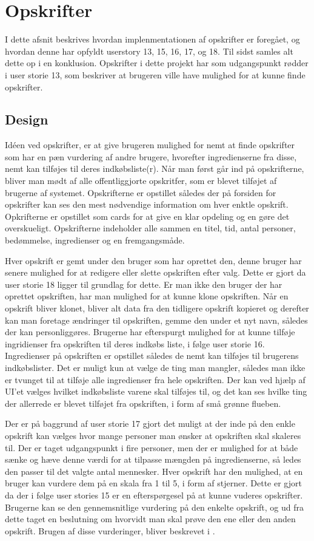 \section{Opskrifter}
I dette afsnit beskrives hvordan implenmentationen af opskrifter er foregået, og hvordan denne har opfyldt userstory 13, 15, 16, 17, og 18. Til sidst samles alt dette op i en konklusion. Opskrifter i dette projekt har som udgangspunkt rødder i user storie 13, som beskriver at brugeren ville have mulighed for at kunne finde opskrifter.
\subsection{Design}
Idéen ved opskrifter, er at give brugeren mulighed for nemt at finde opskrifter som har en pæn vurdering af andre brugere, hvorefter ingredienserne fra disse, nemt kan tilføjes til deres indkøbsliste(r).
Når man først går ind på opskrifterne, bliver man mødt af alle offentliggjorte opskritfer, som er blevet tilføjet af brugerne af systemet.
Opskrifterne er opstillet således der på forsiden for opskrifter kan ses den mest nødvendige information om hver enktle opskrift.
Opkrifterne er opstillet som cards for at give en klar opdeling og en gøre det overskueligt.
Opskrifterne indeholder alle sammen en titel, tid, antal personer, bedømmelse, ingredienser og en fremgangsmåde.


Hver opskrift er gemt under den bruger som har oprettet den, denne bruger har senere mulighed for at redigere eller slette opskriften efter valg.
Dette er gjort da user storie 18 ligger til grundlag for dette.
Er man ikke den bruger der har oprettet opskriften, har man mulighed for at kunne klone opskriften.
Når en opskrift bliver klonet, bliver alt data fra den tidligere opskrift kopieret og derefter kan man foretage ændringer til opskriften, gemme den under et nyt navn, således der kan personliggøres.
Brugerne har efterspurgt mulighed for at kunne tilføje ingridienser fra opskriften til deres indkøbs liste, i følge user storie 16.
Ingredienser på opskriften er opstillet således de nemt kan tilføjes til brugerens indkøbslister.
Det er muligt kun at vælge de ting man mangler, således man ikke er tvunget til at tilføje alle ingredienser fra hele opskriften.
Der kan ved hjælp af UI'et vælges hvilket indkøbsliste varene skal tilføjes til, og det kan ses hvilke ting der allerrede er blevet tilføjet fra opskriften, i form af små grønne flueben.


Der er på baggrund af user storie 17 gjort det muligt at der inde på den enkle opskrift kan vælges hvor mange personer man ønsker at opskriften skal skaleres til.
Der er taget udgangspunkt i fire personer, men der er mulighed for at både sænke og hæve denne værdi for at tilpasse mængden på ingredienserne, så ledes den passer til det valgte antal mennesker.
Hver opskrift har den mulighed, at en bruger kan vurdere dem på en skala fra 1 til 5, i form af stjerner. Dette er gjort da der i følge user stories 15 er en efterspørgesel på at kunne vuderes opskrifter.
Brugerne kan se den gennemsnitlige vurdering på den enkelte opskrift, og ud fra dette taget en beslutning om hvorvidt man skal prøve den ene eller den anden opskrift.
Brugen af disse vurderinger, bliver beskrevet i .


